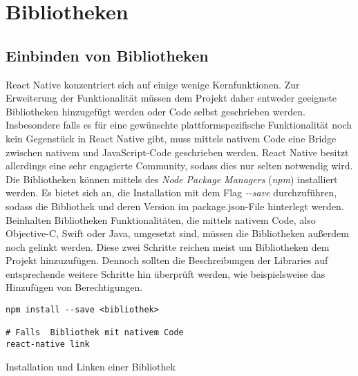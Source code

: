 \section{Bibliotheken}

\subsection{Einbinden von Bibliotheken}
React Native konzentriert sich auf einige wenige Kernfunktionen. Zur Erweiterung der Funktionalität müssen dem Projekt daher entweder geeignete Bibliotheken hinzugefügt werden oder Code selbst geschrieben werden. Insbesondere falls es für eine gewünschte plattformspezifische Funktionalität noch kein Gegenstück in React Native gibt, muss mittels nativem Code eine Bridge zwischen nativem und JavaScript-Code geschrieben werden. React Native besitzt allerdings eine sehr engagierte Community, sodass dies nur selten notwendig wird.\\
Die Bibliotheken können mittels des \textit{Node Package Managers} (\textit{npm}) installiert werden. Es bietet sich an, die Installation mit dem Flag \textit{-{}-save} durchzuführen, sodass die Bibliothek und deren Version im package.json-File hinterlegt werden. Beinhalten Bibliotheken Funktionalitäten, die mittels nativem Code, also Objective-C, Swift oder Java, umgesetzt sind, müssen die Bibliotheken außerdem noch gelinkt werden. Diese zwei Schritte reichen meist um Bibliotheken dem Projekt hinzuzufügen. Dennoch sollten die Beschreibungen der Libraries auf entsprechende weitere Schritte hin überprüft werden, wie beispielsweise das Hinzufügen von Berechtigungen. 

\begin{listing}[H]
    \begin{verbatim}
npm install --save <bibliothek>

# Falls  Bibliothek mit nativem Code
react-native link
    \end{verbatim}
    \caption{Installation und Linken einer Bibliothek}
    \label{lst:lib_install}
\end{listing}

